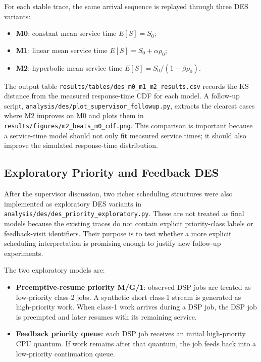 For each stable trace, the same arrival sequence is replayed through three DES variants:

\begin{itemize}
    \item \textbf{M0}: constant mean service time $E[S]=S_0$;
    \item \textbf{M1}: linear mean service time $E[S]=S_0+\alpha\rho_0$;
    \item \textbf{M2}: hyperbolic mean service time $E[S]=S_0/(1-\beta\rho_0)$.
\end{itemize}

The output table \texttt{results/tables/des\_m0\_m1\_m2\_results.csv} records the KS distance from the measured response-time CDF for each model. A follow-up script, \texttt{analysis/des/plot\_supervisor\_followup.py}, extracts the clearest cases where M2 improves on M0 and plots them in \texttt{results/figures/m2\_beats\_m0\_cdf.png}. This comparison is important because a service-time model should not only fit measured service times; it should also improve the simulated response-time distribution.

\subsection{Exploratory Priority and Feedback DES}

After the supervisor discussion, two richer scheduling structures were also implemented as exploratory DES variants in \texttt{analysis/des/des\_priority\_exploratory.py}. These are not treated as final models because the existing traces do not contain explicit priority-class labels or feedback-visit identifiers. Their purpose is to test whether a more explicit scheduling interpretation is promising enough to justify new follow-up experiments.

The two exploratory models are:

\begin{itemize}
    \item \textbf{Preemptive-resume priority M/G/1}: observed DSP jobs are treated as low-priority class-2 jobs. A synthetic short class-1 stream is generated as high-priority work. When class-1 work arrives during a DSP job, the DSP job is preempted and later resumes with its remaining service.
    \item \textbf{Feedback priority queue}: each DSP job receives an initial high-priority CPU quantum. If work remains after that quantum, the job feeds back into a low-priority continuation queue.
\end{itemize}

